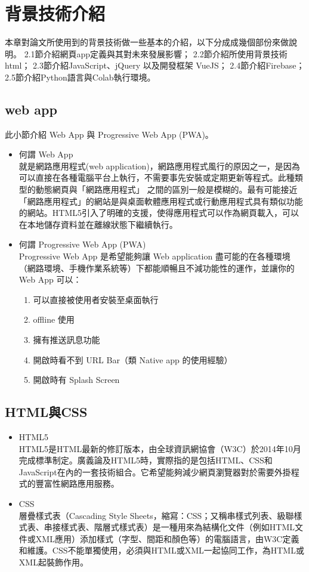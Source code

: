 \chapter{背景技術介紹}
本章對論文所使用到的背景技術做一些基本的介紹，以下分成成幾個部份來做說明。
2.1節介紹網頁app定義與其對未來發展影響； 2.2節介紹所使用背景技術html；
2.3節介紹JavaScript、jQuery 以及開發框架 VueJS；
2.4節介紹Firebase；
2.5節介紹Python語言與Colab執行環境。

\section{web app} 
此小節介紹 Web App 與 Progressive Web App (PWA)。
\begin{itemize}
	\item 何謂 Web App\\
	就是網路應用程式(web application)，網路應用程式風行的原因之一，是因為可以直接在各種電腦平台上執行，不需要事先安裝或定期更新等程式。此種類型的動態網頁與「網路應用程式」 之間的區別一般是模糊的。最有可能接近「網路應用程式」的網站是與桌面軟體應用程式或行動應用程式具有類似功能的網站。HTML5引入了明確的支援，使得應用程式可以作為網頁載入，可以在本地儲存資料並在離線狀態下繼續執行。\cite{name8}
	\item 何謂 Progressive Web App (PWA)\\
	Progressive Web App 是希望能夠讓 Web application 盡可能的在各種環境（網路環境、手機作業系統等）下都能順暢且不減功能性的運作，並讓你的 Web App 可以：
	\begin{enumerate}[1.]
		\item 可以直接被使用者安裝至桌面執行
		\item offline 使用
		\item 擁有推送訊息功能
		\item 開啟時看不到 URL Bar（類 Native app 的使用經驗）
		\item 開啟時有 Splash Screen \cite{name7}
	\end{enumerate}
\end{itemize}

\section{HTML與CSS}
\begin{itemize}
\item HTML5\\
HTML5是HTML最新的修訂版本，由全球資訊網協會（W3C）於2014年10月完成標準制定。廣義論及HTML5時，實際指的是包括HTML、CSS和JavaScript在內的一套技術組合。它希望能夠減少網頁瀏覽器對於需要外掛程式的豐富性網路應用服務。\cite{name9}
\item CSS\\
層疊樣式表（Cascading Style Sheets，縮寫：CSS；又稱串樣式列表、級聯樣式表、串接樣式表、階層式樣式表）是一種用來為結構化文件（例如HTML文件或XML應用）添加樣式（字型、間距和顏色等）的電腦語言，由W3C定義和維護。CSS不能單獨使用，必須與HTML或XML一起協同工作，為HTML或XML起裝飾作用。\cite{name10}
\end{itemize}

